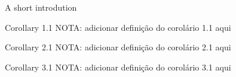 \documentclass{beamer}
\begin{document}
\begin{frame}{A short introdution}

    \begin{block}{Corollary 1.1}
    NOTA: adicionar definição do corolário 1.1 aqui
    \end{block}
    
    \begin{block}{Corollary 2.1}
    NOTA: adicionar definição do corolário 2.1 aqui
    \end{block}
    
    \begin{block}{Corollary 3.1}
    NOTA: adicionar definição do corolário 3.1 aqui
    \end{block}
 
\end{frame}
\end{document}
